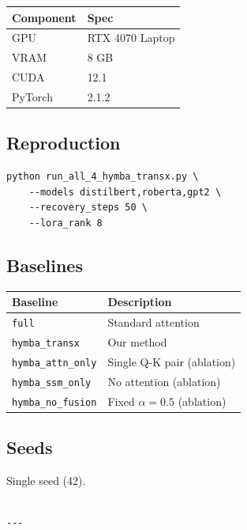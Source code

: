 \begin{table}[H]
\centering
\small
\begin{tabular}{ll}
\toprule
\textbf{Component} & \textbf{Spec} \\
\midrule
GPU & RTX 4070 Laptop \\
VRAM & 8 GB \\
CUDA & 12.1 \\
PyTorch & 2.1.2 \\
\bottomrule
\end{tabular}
\end{table}

\subsection{Reproduction}

\begin{lstlisting}
python run_all_4_hymba_transx.py \
    --models distilbert,roberta,gpt2 \
    --recovery_steps 50 \
    --lora_rank 8
\end{lstlisting}

\subsection{Baselines}

\begin{table}[H]
\centering
\small
\begin{tabular}{ll}
\toprule
\textbf{Baseline} & \textbf{Description} \\
\midrule
\texttt{full} & Standard attention \\
\texttt{hymba\_transx} & Our method \\
\texttt{hymba\_attn\_only} & Single Q-K pair (ablation) \\
\texttt{hymba\_ssm\_only} & No attention (ablation) \\
\texttt{hymba\_no\_fusion} & Fixed $\alpha = 0.5$ (ablation) \\
\bottomrule
\end{tabular}
\end{table}

\subsection{Seeds}

Single seed (42).
\begin{lstlisting}

---
\end{lstlisting}

